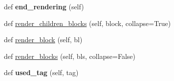 \begin{DoxyCompactItemize}
\item 
\hypertarget{classtexla_1_1Renderers_1_1Renderer_1_1Renderer_a0c01fa2fc88f08a8ad3b4eb10a6cbf56}{}\label{classtexla_1_1Renderers_1_1Renderer_1_1Renderer_a0c01fa2fc88f08a8ad3b4eb10a6cbf56} 
def {\bfseries end\+\_\+rendering} (self)
\item 
def \hyperlink{classtexla_1_1Renderers_1_1Renderer_1_1Renderer_a3fda0b658f6e8b0215e2d9062d0f0893}{render\+\_\+children\+\_\+blocks} (self, block, collapse=True)
\item 
def \hyperlink{classtexla_1_1Renderers_1_1Renderer_1_1Renderer_ae58221b6a1aec6777d7e6d1bbc97e254}{render\+\_\+block} (self, bl)
\item 
def \hyperlink{classtexla_1_1Renderers_1_1Renderer_1_1Renderer_af8fccb30690606612e6c62851cd899fe}{render\+\_\+blocks} (self, bls, collapse=False)
\item 
\hypertarget{classtexla_1_1Renderers_1_1Renderer_1_1Renderer_a34cd4a95caeb1ffcc144fb71321ef671}{}\label{classtexla_1_1Renderers_1_1Renderer_1_1Renderer_a34cd4a95caeb1ffcc144fb71321ef671} 
def {\bfseries used\+\_\+tag} (self, tag)
\end{DoxyCompactItemize}

